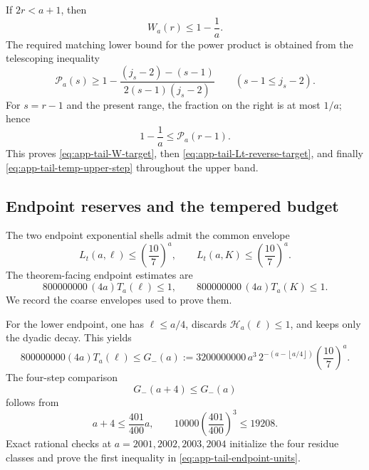 \documentclass[11pt]{article}
\theoremstyle{definition}
\theoremstyle{remark}
\newcommand{\floor}[1]{\left\lfloor #1\right\rfloor}
\begin{document}
If $2r<a+1$, then
\begin{equation}\label{eq:app-tail-W-lowhalf}
 W_a(r)\le1-\frac1a.
\end{equation}
The required matching lower bound for the power product is obtained from the
telescoping inequality
\begin{equation}\label{eq:app-tail-P-gap}
 \mathcal P_a(s)\ge
 1-\frac{(j_s-2)-(s-1)}{2(s-1)(j_s-2)}
 \qquad(s-1\le j_s-2).
\end{equation}
For $s=r-1$ and the present range, the fraction on the right is at most
$1/a$; hence
\begin{equation}\label{eq:app-tail-P-lowhalf}
 1-\frac1a\le\mathcal P_a(r-1).
\end{equation}
This proves \eqref{eq:app-tail-W-target}, then
\eqref{eq:app-tail-Lt-reverse-target}, and finally
\eqref{eq:app-tail-temp-upper-step} throughout the upper band.

\subsection{Endpoint reserves and the tempered budget}

The two endpoint exponential shells admit the common envelope
\begin{equation}\label{eq:app-tail-ten-sevenths}
 L_t(a,\ell)\le\left(\frac{10}{7}\right)^a,
 \qquad
 L_t(a,K)\le\left(\frac{10}{7}\right)^a.
\end{equation}
The theorem-facing endpoint estimates are
\begin{equation}\label{eq:app-tail-endpoint-units}
 800000000\,(4a)T_a(\ell)\le1,
 \qquad
 800000000\,(4a)T_a(K)\le1.
\end{equation}
We record the coarse envelopes used to prove them.

For the lower endpoint, one has $\ell\le a/4$, discards
$\mathcal H_a(\ell)\le1$, and keeps only the dyadic decay.  This yields
\begin{equation}\label{eq:app-tail-Gminus}
 800000000(4a)T_a(\ell)
 \le G_-(a):=
 3200000000\,a^3\,2^{-(a-\floor{a/4})}
 \left(\frac{10}{7}\right)^a.
\end{equation}
The four-step comparison
\begin{equation}\label{eq:app-tail-Gminus-step}
 G_-(a+4)\le G_-(a)
\end{equation}
follows from
\begin{equation}\label{eq:app-tail-Gminus-constants}
 a+4\le\frac{401}{400}a,
 \qquad
 10000\left(\frac{401}{400}\right)^3\le19208.
\end{equation}
Exact rational checks at $a=2001,2002,2003,2004$ initialize the four residue
classes and prove the first inequality in
\eqref{eq:app-tail-endpoint-units}.
\end{document}
